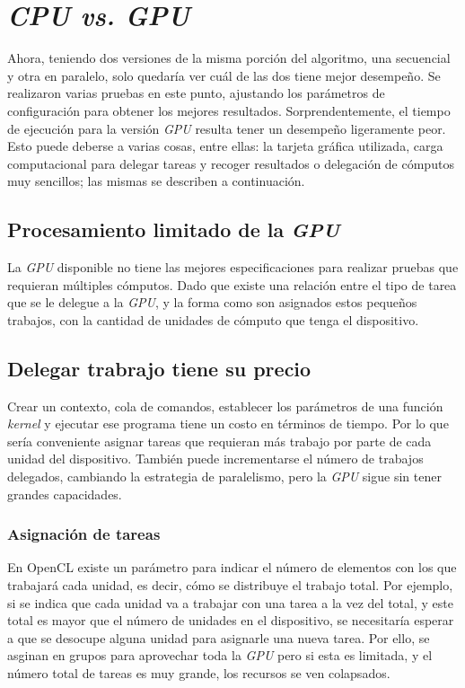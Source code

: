\section{\textit{CPU vs. GPU}}

Ahora, teniendo dos versiones de la misma porción del algoritmo, una secuencial y otra en paralelo, solo quedaría ver cuál de las dos tiene mejor desempeño. Se realizaron varias pruebas en este punto, ajustando los parámetros de configuración para obtener los mejores resultados. Sorprendentemente, el tiempo de ejecución para la versión \textit{GPU} resulta tener un desempeño ligeramente peor. Esto puede deberse a varias cosas, entre ellas: la tarjeta gráfica utilizada, carga computacional para delegar tareas y recoger resultados o delegación de cómputos muy sencillos; las mismas se describen a continuación.

\subsection{Procesamiento limitado de la \textit{GPU}}

La \textit{GPU} disponible no tiene las mejores especificaciones para realizar pruebas que requieran múltiples cómputos. Dado que existe una relación entre el tipo de tarea que se le delegue a la \textit{GPU}, y la forma como son asignados estos pequeños trabajos, con la cantidad de unidades de cómputo que tenga el dispositivo.

\subsection{Delegar trabrajo tiene su precio}

Crear un contexto, cola de comandos, establecer los parámetros de una función \textit{kernel} y ejecutar ese programa tiene un costo en términos de tiempo. Por lo que sería conveniente asignar tareas que requieran más trabajo por parte de cada unidad del dispositivo. También puede incrementarse el número de trabajos delegados, cambiando la estrategia de paralelismo, pero la \textit{GPU} sigue sin tener grandes capacidades.

\subsubsection{Asignación de tareas}

En OpenCL existe un parámetro para indicar el número de elementos con los que trabajará cada unidad, es decir, cómo se distribuye el trabajo total. Por ejemplo, si se indica que cada unidad va a trabajar con una tarea a la vez del total, y este total es mayor que el número de unidades en el dispositivo, se necesitaría esperar a que se desocupe alguna unidad para asignarle una nueva tarea. Por ello, se asginan en grupos para aprovechar toda la \textit{GPU} pero si esta es limitada, y el número total de tareas es muy grande, los recursos se ven colapsados.